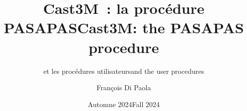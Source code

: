 \documentclass[xcolor={dvipsnames}]{beamer}
\title{Cast3M~: la procédure PASAPAS}
\subtitle{et les procédures utilisateurs}
\date{Automne 2024}}
\title{Cast3M: the PASAPAS procedure}
\subtitle{and the user procedures}
\date{Fall 2024}}
\author{François Di Paola}
\institute{CEA Saclay,\\
\url{http://www-cast3m.cea.fr}}
\newcommand{\fe}[2]{\justfor{french}{#1}\justfor{english}{#2}}
\newcommand{\red}[1]{\textcolor{red}{#1}}
\newcommand{\blue}[1]{\textcolor{blue}{#1}}
\begin{document}
\begin{frame}
  \titlepage
\end{frame}


% 
% 
% 
% 
% 
% 
% 

% 
% 
\end{document}
